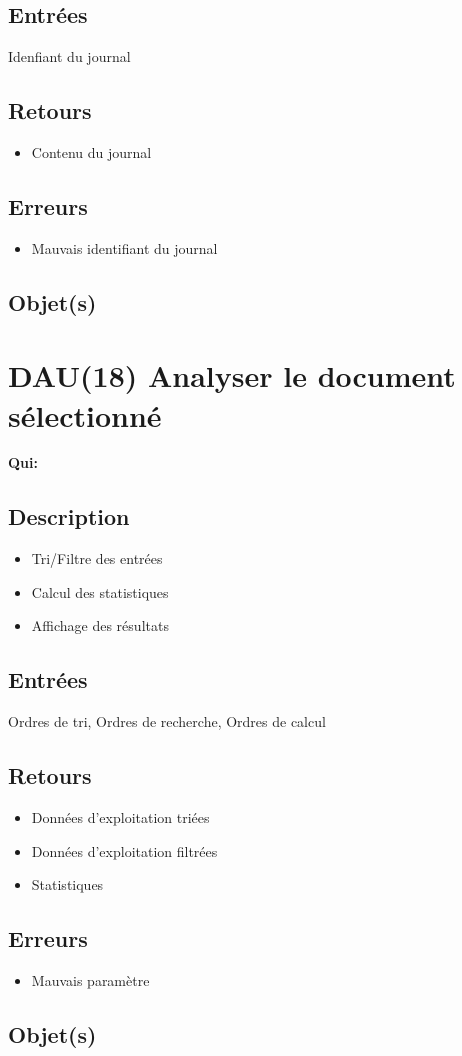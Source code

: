 	\subsection{Entrées}
		Idenfiant du journal

	\subsection{Retours}
	\begin{itemize}
		\item Contenu du journal
	\end{itemize}

	\subsection{Erreurs}
	\begin{itemize}
		\item Mauvais identifiant du journal \fatal
	\end{itemize}

	\subsection{Objet(s)}
		\logs

\section{DAU(18) Analyser le document sélectionné}
	\textbf{Qui:} \urt

	\subsection{Description}
	\begin{itemize}
		\item Tri/Filtre des entrées
		\item Calcul des statistiques
		\item Affichage des résultats
	\end{itemize}

	\subsection{Entrées}
		Ordres de tri, Ordres de recherche, Ordres de calcul

	\subsection{Retours}
	\begin{itemize}
		\item Données d'exploitation triées
		\item Données d'exploitation filtrées
		\item Statistiques
	\end{itemize}

	\subsection{Erreurs}
	\begin{itemize}
		\item Mauvais paramètre \warning
	\end{itemize}

	\subsection{Objet(s)}
		\logs

